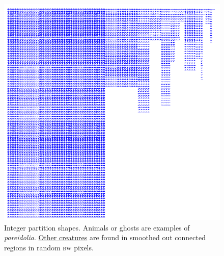 \documentclass[../notebook.tex]{subfiles}
\begin{document}
\begin{figure}[ht]
  \centering
  \includegraphics{../python-notebooks/intpartitions_6_grid.pdf}
  \caption{Integer partition shapes. Animals or ghosts are examples of
    \textit{pareidolia}.
    \href{https://web.archive.org/web/20181010091056/http://community.wolfram.com/groups/-/m/t/995095}{%
    Other creatures}
    are found in smoothed out connected regions in random \textsc{bw}
  pixels.}\label{fig:intpartitions}
\end{figure}
\end{document}

